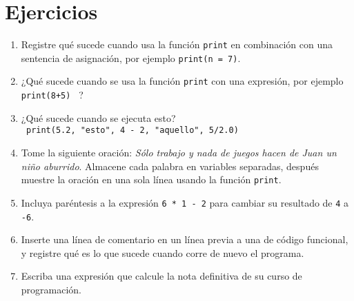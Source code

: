 \begin{description}
\end{description}

\section{Ejercicios}

\begin{enumerate}
	\item Registre qué sucede cuando usa la función \texttt{print} en 
	combinación con una sentencia de asignación, por ejemplo 
	\verb+print(n = 7)+.
	\item ¿Qué sucede cuando se usa la función \texttt{print} con una 
	expresión,  por ejemplo	\verb# print(8+5) #  ?
	\item ¿Qué sucede cuando se ejecuta esto?\\
	\verb+ print(5.2, "esto", 4 - 2, "aquello", 5/2.0)+
	\item Tome la siguiente oración: \textit{Sólo trabajo y nada de juegos 
	hacen de Juan un niño aburrido}. Almacene cada palabra en variables 
	separadas, después muestre la oración en una sola línea usando la función 
	\texttt{print}.
	\item Incluya paréntesis a la expresión \texttt{6 * 1 - 2} para cambiar su 
	resultado de \texttt{4} a \texttt{-6}.
	\item Inserte una línea de comentario en un línea previa a una de código 
	funcional, y registre qué es lo que sucede cuando corre de nuevo el 
	programa.
	\item Escriba una expresión que calcule la nota definitiva de su curso de 
	programación.
\end{enumerate}
